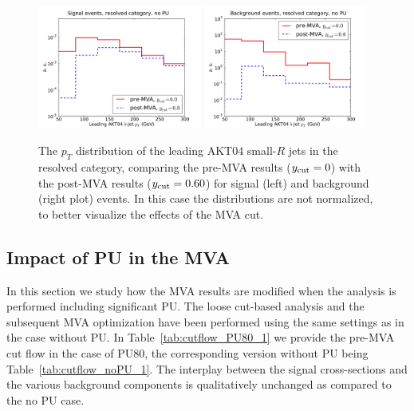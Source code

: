\begin{figure}[t]
\begin{center}
\includegraphics[width=0.48\textwidth]{plots/pt_H0_sub0_res_noPU_ANNcut.pdf}
\includegraphics[width=0.48\textwidth]{plots/pt_H0_sub0_res_noPU_ANNcut_back.pdf}
\caption{\small
  The $p_T$ distribution of the leading AKT04 small-$R$ jets in the resolved
  category, comparing the pre-MVA results ($y_{\rm cut}=0$) with the post-MVA
  results ($y_{\rm cut}=0.60$) for signal (left) and background (right plot) events.
  In this case the distributions are not normalized, to better visualize the effects
  of the MVA cut.
}
\label{fig:pt_H0_sub0_res_noPU_ANNcut}
\end{center}
\end{figure}



\subsection{Impact of PU in the MVA}

In this section we study how the MVA results are modified
when the analysis is performed including significant PU.
%
The loose cut-based analysis and the subsequent
MVA optimization have been performed using the same
settings as in the case without PU.
%
In Table~\ref{tab:cutflow_PU80_1}
we provide the pre-MVA cut flow in the case of PU80,
the corresponding version without PU being
Table~\ref{tab:cutflow_noPU_1}.
%
The interplay between the signal cross-sections and the various
background components is qualitatively unchanged as compared
to the no PU case.

